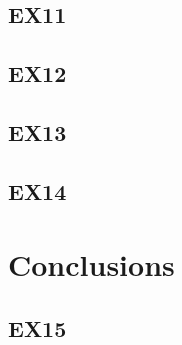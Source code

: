 \documentclass{article}
\begin{document}
	\subsection{EX11}
		
	\subsection{EX12}
	
	\subsection{EX13}
	
	\subsection{EX14}
	
	\section{Conclusions}
	
	\subsection{EX15}
\end{document}
